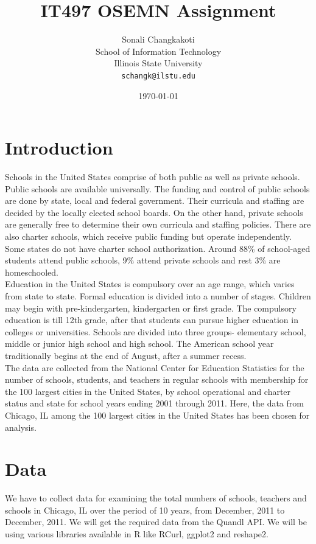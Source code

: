 \documentclass{article}\usepackage[]{graphicx}\usepackage[]{color}
\begin{document}
\title { IT497 OSEMN Assignment} 
\author { Sonali Changkakoti
\\ School of Information Technology 
\\ Illinois State University
\\
\texttt{schangk@ilstu.edu}}
\date{\today} 


\section{Introduction}
Schools in the United States comprise of both public as well as private schools. Public schools are available universally. The funding and control of public schools are done by state, local and federal government. Their curricula and staffing are decided by the locally elected school boards. On the other hand, private schools are generally free to determine their own curricula and staffing policies. There are also charter schools, which receive public funding but operate independently. Some states do not have charter school authorization. Around 88\% of school-aged students attend public schools, 9\% attend private schools and rest 3\% are homeschooled. 
\\Education in the United States is compulsory over an age range, which varies from state to state. Formal education is divided into a number of stages. Children may begin with pre-kindergarten, kindergarten or first grade. The compulsory education is till 12th grade, after that students can pursue higher education in colleges or universities. Schools are divided into three groups- elementary school, middle or junior high school and high school. The American school year traditionally begins at the end of August, after a summer recess. 
\\The data are collected from the National Center for Education Statistics for the number of schools, students, and teachers in regular schools with membership for the 100 largest cities in the United States, by school operational and charter status and state for school years ending 2001 through 2011. Here, the data from Chicago, IL among the 100 largest cities in the United States has been chosen for analysis.


\section {Data}
We have to collect data for examining the total numbers of schools, teachers and schools in Chicago, IL over the period of 10 years, from December, 2011 to December, 2011. We will get the required data from the Quandl API. We will be using various libraries available in R like RCurl, ggplot2 and reshape2.
\end{document}
